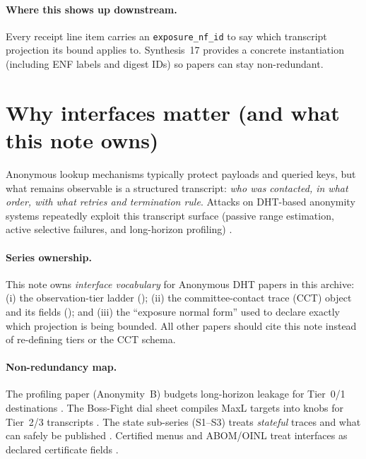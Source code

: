 \documentclass[11pt]{article}
\begin{document}
\paragraph{Where this shows up downstream.}
Every receipt line item carries an \texttt{exposure\_nf\_id} to say which transcript projection its bound applies to.\cite{series:receiptitems}
Synthesis~17 provides a concrete instantiation (including ENF labels and digest IDs) so papers can stay non-redundant.\cite{series:workedexample}

\section{Why interfaces matter (and what this note owns)}
Anonymous lookup mechanisms typically protect payloads and queried keys, but what remains observable is a structured transcript: \emph{who was contacted, in what order, with what retries and termination rule}.
Attacks on DHT-based anonymity systems repeatedly exploit this transcript surface (passive range estimation, active selective failures, and long-horizon profiling) \cite{WangMittalBorisovCCS2010,MittalBorisov2012InfoLeaks,WangOctopus2012}.

\paragraph{Series ownership.}
This note owns \emph{interface vocabulary} for Anonymous DHT papers in this archive:
(i) the observation-tier ladder ();
(ii) the committee-contact trace (CCT) object and its fields (); and
(iii) the ``exposure normal form'' used to declare exactly which projection is being bounded.
All other papers should cite this note instead of re-defining tiers or the CCT schema.

\paragraph{Non-redundancy map.}
The profiling paper (Anonymity~B) budgets long-horizon leakage for Tier~0/1 destinations \cite{series:profiling}.
The Boss-Fight dial sheet compiles MaxL targets into knobs for Tier~2/3 transcripts \cite{series:bossfightA,series:bossfightB}.
The state sub-series (S1--S3) treats \emph{stateful} traces and what can safely be published \cite{series:state1,series:state2,series:state3}.
Certified menus and ABOM/OINL treat interfaces as declared certificate fields \cite{series:certmenus,series:abomoinl}.
\end{document}
